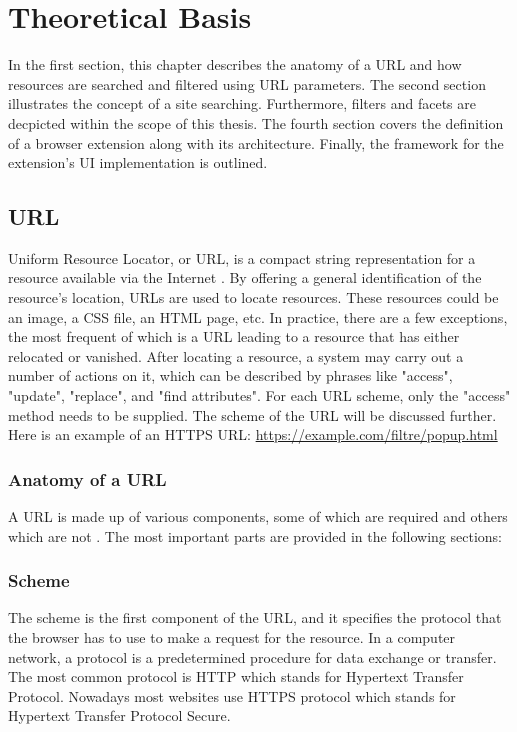 \newpage
\chapter{Theoretical Basis}
In the first section, this chapter describes the anatomy of a URL and how resources are searched and filtered using URL parameters. The second section illustrates the concept of a site searching. Furthermore, filters and facets are decpicted within the scope of this thesis. The fourth section covers the definition of a browser extension along with its architecture. Finally, the framework for the extension's UI implementation is outlined.


\section{URL}
Uniform Resource Locator, or URL, is a compact string representation for a resource available via the Internet \autocite{berners1994uniform}. By offering a general identification of the resource's location, URLs are used to locate resources. These resources could be an image, a CSS file, an HTML page, etc. In practice, there are a few exceptions, the most frequent of which is a URL leading to a resource that has either relocated or vanished. After locating a resource, a system may carry out a number of actions on it, which can be described by phrases like "access", "update", "replace", and "find attributes". For each URL scheme, only the "access" method needs to be supplied. The scheme of the URL will be discussed further. Here is an example of an HTTPS URL: \url{https://example.com/filtre/popup.html}

\subsection{Anatomy of a URL}
\label{url_anatomy}
A URL is made up of various components, some of which are required and others which are not \autocite{mozilla2022url}. The most important parts are provided in the following sections:

\subsection*{Scheme}
The scheme is the first component of the URL, and it specifies the protocol that the browser has to use to make a request for the resource. In a computer network, a protocol is a predetermined procedure for data exchange or transfer. The most common protocol is HTTP which stands for Hypertext Transfer Protocol. Nowadays most websites use HTTPS protocol which stands for Hypertext Transfer Protocol Secure.

